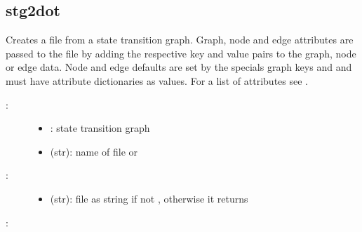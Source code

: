 \documentclass[letterpaper,10pt,english]{sphinxmanual}
\begin{document}
\subsection{stg2dot}
\label{\detokenize{StateTransitionGraphs:stg2dot}}\label{\detokenize{StateTransitionGraphs:id18}}

\begin{fulllineitems}
\label{\detokenize{StateTransitionGraphs:PyBoolNet.StateTransitionGraphs.stg2dot}}
Creates a  file from a state transition graph.
Graph, node and edge attributes are passed to the  file by adding the respective key and value pairs to the graph, node or edge data.
Node and edge defaults are set by the specials graph keys  and  and must have attribute dictionaries as values.
For a list of attributes see .
\begin{description}
\item[{:}] \leavevmode\begin{itemize}
\item {} 
: state transition graph

\item {} 
 (str): name of  file or 

\end{itemize}

\item[{:}] \leavevmode\begin{itemize}
\item {} 
 (str): file as string if not , otherwise it returns 

\end{itemize}

\end{description}

:


\end{fulllineitems}
\end{document}
